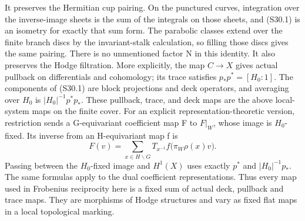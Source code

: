 It preserves the Hermitian cup pairing. On the punctured curves,
integration over the inverse-image sheets is the sum of the integrals
on those sheets, and (S30.1) is an isometry for exactly that sum form.
The parabolic classes extend over the finite branch discs by the
invariant-stalk calculation, so filling those discs gives the same
pairing. There is no unmentioned factor N in this identity.
It also preserves the Hodge filtration. More explicitly, the map
\(C\to X\) gives actual pullback on differentials and cohomology;
its trace satisfies \(p_*p^*=[H_0:1]\). The components of
(S30.1) are block projections and deck operators, and averaging over
\(H_0\) is \(|H_0|^{-1}p^*p_*\). These pullback, trace,
and deck maps are the above local-system maps on the finite cover.
For an explicit representation-theoretic version, restriction sends a
G-equivariant coefficient map F to \(F|_W\), whose image is
\(H_0\)-fixed. Its inverse from an H-equivariant map f is
\[
       F(v)=\sum_{x\in H\backslash G}
                T_{x^{-1}}f\bigl(\pi_W\rho(x)v\bigr).
\]
Passing between the \(H_0\)-fixed image and \(H^1(X)\)
uses exactly \(p^*\) and \(|H_0|^{-1}p_*\). The same
formulas apply to the dual coefficient representations. Thus every
map used in Frobenius reciprocity here is a fixed sum of actual deck,
pullback and trace maps. They are morphisms of Hodge structures and
vary as fixed flat maps in a local topological marking.

